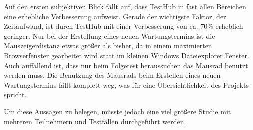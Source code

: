 Auf den ersten subjektiven Blick fällt auf, dass TestHub in fast allen Bereichen eine erhebliche
Verbesserung aufweist. Gerade der wichtigste Faktor, der Zeitaufwand, ist durch TestHub 
mit einer Verbesserung von ca. 70\% erheblich geringer. Nur bei der Erstellung eines neuen Wartungstermins
ist die Mauszeigerdistanz etwas größer als bisher, da in einem maximierten Browserfenster
gearbeitet wird statt im kleinen Windows Dateiexplorer Fenster. Auch auffallend ist,
dass nur beim Folgetest heraussuchen das Mausrad benutzt werden muss. Die Benutzung des 
Mausrads beim Erstellen eines neuen Wartungstermins fällt komplett weg, was für 
eine Übersichtlichkeit des Projekts spricht.

Um diese Aussagen zu belegen, müsste jedoch eine viel größere Studie mit mehreren 
Teilnehmern und Testfällen durchgeführt werden.

\newpage


